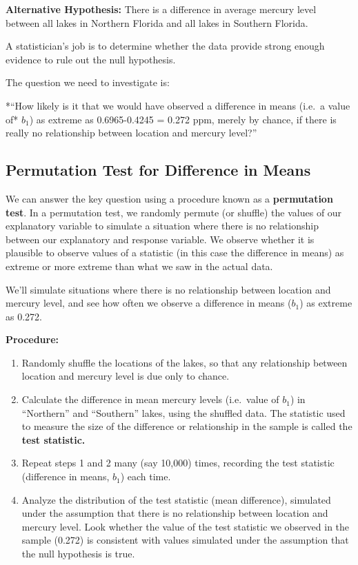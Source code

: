\documentclass[
  letterpaper,
  DIV=11,
  numbers=noendperiod]{scrreprt}
\begin{document}
\textbf{Alternative Hypothesis:} There is a difference in average
mercury level between all lakes in Northern Florida and all lakes in
Southern Florida.

A statistician's job is to determine whether the data provide strong
enough evidence to rule out the null hypothesis.

The question we need to investigate is:

*``How likely is it that we would have observed a difference in means
(i.e.~a value of* \(b_1\)) as extreme as 0.6965-0.4245 = 0.272 ppm,
merely by chance, if there is really no relationship between location
and mercury level?''

\subsection{Permutation Test for Difference in
Means}\label{permutation-test-for-difference-in-means}

We can answer the key question using a procedure known as a
\textbf{permutation test}. In a permutation test, we randomly permute
(or shuffle) the values of our explanatory variable to simulate a
situation where there is no relationship between our explanatory and
response variable. We observe whether it is plausible to observe values
of a statistic (in this case the difference in means) as extreme or more
extreme than what we saw in the actual data.

We'll simulate situations where there is no relationship between
location and mercury level, and see how often we observe a difference in
means (\(b_1\)) as extreme as 0.272.

\textbf{Procedure:}

\begin{enumerate}
\def\labelenumi{\arabic{enumi}.}
\item
  Randomly shuffle the locations of the lakes, so that any relationship
  between location and mercury level is due only to chance.
\item
  Calculate the difference in mean mercury levels (i.e.~value of
  \(b_1\)) in ``Northern'' and ``Southern'' lakes, using the shuffled
  data. The statistic used to measure the size of the difference or
  relationship in the sample is called the \textbf{test statistic.}
\item
  Repeat steps 1 and 2 many (say 10,000) times, recording the test
  statistic (difference in means, \(b_1\)) each time.
\item
  Analyze the distribution of the test statistic (mean difference),
  simulated under the assumption that there is no relationship between
  location and mercury level. Look whether the value of the test
  statistic we observed in the sample (0.272) is consistent with values
  simulated under the assumption that the null hypothesis is true.
\end{enumerate}
\end{document}
